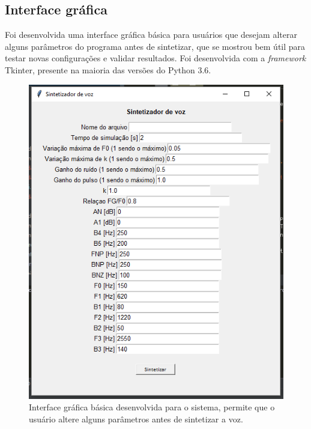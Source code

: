 \documentclass[
  12pt,       
  openright,      
  twoside,      
  a4paper,      
  english,      
  french,       
  spanish,      
  brazil,     
  ]{abntex2}
\begin{document}
\subsection{Interface gráfica}
Foi desenvolvida uma interface gráfica básica para usuários que desejam alterar alguns parâmetros do programa antes de sintetizar, que se mostrou bem útil para testar novas configurações e validar resultados. Foi desenvolvida com a \textit{framework} Tkinter, presente na maioria das versões do Python 3.6.

\begin{figure}
\includegraphics[width=\textwidth,keepaspectratio]{imagens/gui_basica.PNG}
\caption{Interface gráfica básica desenvolvida para o sistema, permite que o usuário altere alguns parâmetros antes de sintetizar a voz.}
\label{fig:guiBasica}
\end{figure}
\end{document}
